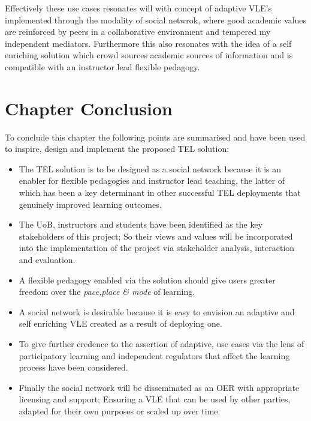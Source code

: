 \begin{itemize}[\null]
\begin{itemize}
        Effectively these use cases resonates will with concept of adaptive VLE's implemented through the modality of social netwrok, where good academic values are reinforced by peers in a collaborative environment and tempered my independent mediators. Furthermore this also resonates with the idea of a self enriching solution which crowd sources academic sources of information and is compatible with an instructor lead flexible pedagogy.
    \end{itemize}
    

    
    \end{itemize}
    
\section{Chapter Conclusion}

To conclude this chapter the following points are summarised and have been used to inspire, design and implement the proposed TEL solution:

\begin{itemize}
    \item The TEL solution is to be designed as a social network because it is an enabler for flexible pedagogies and instructor lead teaching, the latter of which has been a key determinant in other successful TEL deployments that genuinely improved learning outcomes.
    \item The UoB, instructors and students have been identified as the key stakeholders of this project; So their views  and values will be incorporated into the implementation of the project via stakeholder analysis, interaction and evaluation.
    \item A flexible pedagogy enabled via the solution should give users greater freedom over the \textit{pace,place \& mode} of learning.
    \item A social network is desirable because it is easy to envision an adaptive and self enriching VLE created as a result of deploying one.
    \item To give further credence to the assertion of adaptive, use cases via the lens of participatory learning and independent regulators that affect the learning process have been considered.
    \item Finally the social network will be disseminated as an OER with appropriate licensing and support; Ensuring a VLE that can be used by other parties, adapted for their own purposes or scaled up over time.
\end{itemize}

    
    
    
    